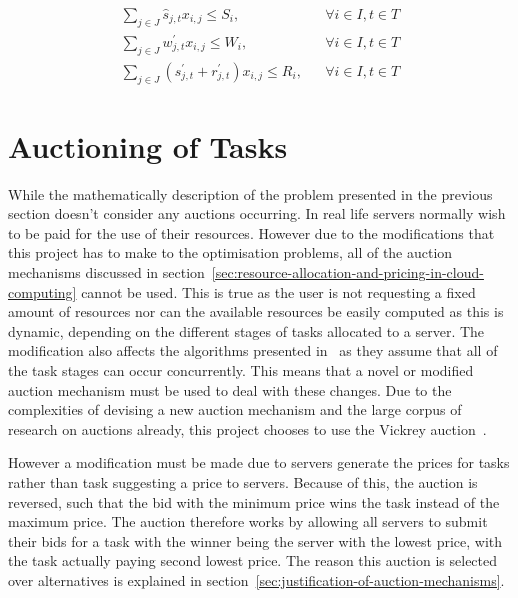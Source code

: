\begin{align}
    \sum_{j \in J} \hat{s}_{j,t} x_{i,j} \leq S_i, && \forall{i \in I, t \in T} \label{eq:server_storage_capacity} \\
    \sum_{j \in J} w^{'}_{j,t} x_{i,j} \leq W_i, && \forall{i \in I, t \in T} \label{eq:server_computation_capacity} \\
    \sum_{j \in J} (s^{'}_{j,t} + r^{'}_{j,t}) x_{i,j} \leq R_i, && \forall{i \in I, t \in T} \label{eq:server_bandwidth_capacity}
\end{align}

\section{Auctioning of Tasks}\label{sec:auctioning-of-tasks}
While the mathematically description of the problem presented in the previous section doesn't consider any auctions
occurring. In real life servers normally wish to be paid for the use of their resources. However due to the modifications
that this project has to make to the optimisation problems, all of the auction mechanisms discussed in
section~\ref{sec:resource-allocation-and-pricing-in-cloud-computing} cannot be used. This is true as the user is not
requesting a fixed amount of resources nor can the available resources be easily computed as this is dynamic, depending
on the different stages of tasks allocated to a server. The modification also affects the algorithms presented
in~\cite{FlexibleResourceAllocation} as they assume that all of the task stages can occur concurrently. This means that
a novel or modified auction mechanism must be used to deal with these changes. Due to the complexities of devising a new
auction mechanism and the large corpus of research on auctions already, this project chooses to use the Vickrey
auction~\citep{vickrey}.

However a modification must be made due to servers generate the prices for tasks rather than task suggesting a price to servers.
Because of this, the auction is reversed, such that the bid with the minimum price wins the task instead of the maximum
price. The auction therefore works by allowing all servers to submit their bids for a task with the winner
being the server with the lowest price, with the task actually paying second lowest price. The reason this auction is
selected over alternatives is explained in section~\ref{sec:justification-of-auction-mechanisms}.

